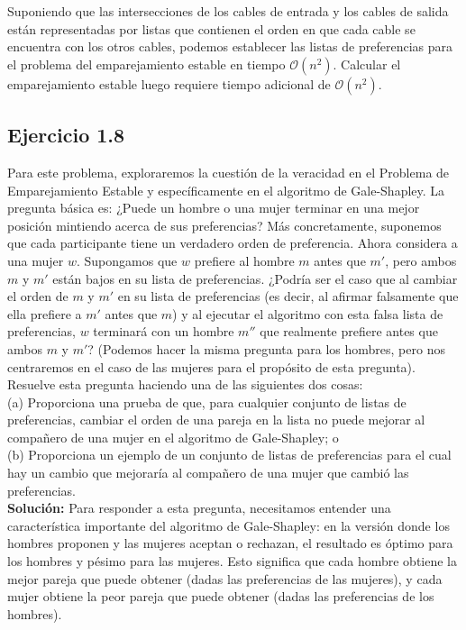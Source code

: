 \documentclass{article}
\begin{document}
Suponiendo que las intersecciones de los cables de entrada y los cables de salida están representadas por listas que contienen el orden en que cada cable se encuentra con los otros cables, podemos establecer las listas de preferencias para el problema del emparejamiento estable en tiempo $\mathcal{O}(n^2)$. Calcular el emparejamiento estable luego requiere tiempo adicional de $\mathcal{O}(n^2)$.

\subsection{Ejercicio 1.8}
Para este problema, exploraremos la cuestión de la veracidad en el Problema de Emparejamiento Estable y específicamente en el algoritmo de Gale-Shapley. La pregunta básica es: ¿Puede un hombre o una mujer terminar en una mejor posición mintiendo acerca de sus preferencias? Más concretamente, suponemos que cada participante tiene un verdadero orden de preferencia. Ahora considera a una mujer $w$. Supongamos que $w$ prefiere al hombre $m$ antes que $m'$, pero ambos $m$ y $m'$ están bajos en su lista de preferencias. ¿Podría ser el caso que al cambiar el orden de $m$ y $m'$ en su lista de preferencias (es decir, al afirmar falsamente que ella prefiere a $m'$ antes que $m$) y al ejecutar el algoritmo con esta falsa lista de preferencias, $w$ terminará con un hombre $m''$ que realmente prefiere antes que ambos $m$ y $m'$? (Podemos hacer la misma pregunta para los hombres, pero nos centraremos en el caso de las mujeres para el propósito de esta pregunta).\\

Resuelve esta pregunta haciendo una de las siguientes dos cosas:\\

(a) Proporciona una prueba de que, para cualquier conjunto de listas de preferencias, cambiar el orden de una pareja en la lista no puede mejorar al compañero de una mujer en el algoritmo de Gale-Shapley; o\\

(b) Proporciona un ejemplo de un conjunto de listas de preferencias para el cual hay un cambio que mejoraría al compañero de una mujer que cambió las preferencias.\\

\textbf{Solución:} Para responder a esta pregunta, necesitamos entender una característica importante del algoritmo de Gale-Shapley: en la versión donde los hombres proponen y las mujeres aceptan o rechazan, el resultado es óptimo para los hombres y pésimo para las mujeres. Esto significa que cada hombre obtiene la mejor pareja que puede obtener (dadas las preferencias de las mujeres), y cada mujer obtiene la peor pareja que puede obtener (dadas las preferencias de los hombres).\\
\end{document}
